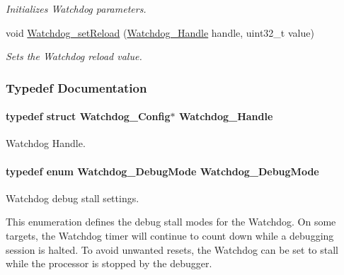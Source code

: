 \begin{DoxyCompactItemize}
\begin{DoxyCompactList}\small\item\em Initializes Watchdog parameters. \end{DoxyCompactList}\item 
void \hyperlink{_watchdog_8h_a77ec81e1304fe05b77a9976e10e2d9a3}{Watchdog\-\_\-set\-Reload} (\hyperlink{_watchdog_8h_a00ed22749c947ef200434eeec507f90d}{Watchdog\-\_\-\-Handle} handle, uint32\-\_\-t value)
\begin{DoxyCompactList}\small\item\em Sets the Watchdog reload value. \end{DoxyCompactList}\end{DoxyCompactItemize}


\subsubsection{Typedef Documentation}
\paragraph[{Watchdog\-\_\-\-Handle}]{\setlength{\rightskip}{0pt plus 5cm}typedef struct {\bf Watchdog\-\_\-\-Config}$\ast$ {\bf Watchdog\-\_\-\-Handle}}\label{_watchdog_8h_a00ed22749c947ef200434eeec507f90d}


Watchdog Handle. 

\paragraph[{Watchdog\-\_\-\-Debug\-Mode}]{\setlength{\rightskip}{0pt plus 5cm}typedef enum {\bf Watchdog\-\_\-\-Debug\-Mode}  {\bf Watchdog\-\_\-\-Debug\-Mode}}\label{_watchdog_8h_a369f0c40c3acb08f0ad21df99aedd42f}


Watchdog debug stall settings. 

This enumeration defines the debug stall modes for the Watchdog. On some targets, the Watchdog timer will continue to count down while a debugging session is halted. To avoid unwanted resets, the Watchdog can be set to stall while the processor is stopped by the debugger. 
